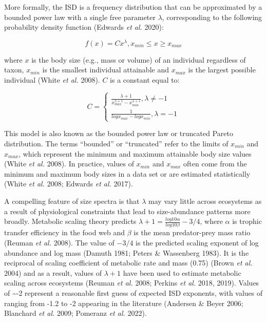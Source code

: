 \documentclass[
  12pt,
]{article}
\begin{document}
More formally, the ISD is a frequency distribution that can be
approximated by a bounded power law with a single free parameter
\(\lambda\), corresponding to the following probability density function
(Edwards \emph{et al.} 2020):

\begin{equation}
f(x) = Cx^\lambda, x_{min} \le x \ge x_{max}
\end{equation}

where \(x\) is the body size (e.g., mass or volume) of an individual
regardless of taxon, \(x_{min}\) is the smallest individual attainable
and \(x_{max}\) is the largest possible individual (White \emph{et al.}
2008). \(C\) is a constant equal to:

\begin{equation}
 C = \begin{cases}\frac{\lambda + 1}{{x_{max}^{\lambda+1}} - {x_{min}^{\lambda+1}}}, \lambda \neq-1 \\
\frac{1}{{logx_{max}} - {logx_{min}}}, \lambda = -1\end{cases}
\end{equation}

This model is also known as the bounded power law or truncated Pareto
distribution. The terms ``bounded'' or ``truncated'' refer to the limits
of \(x_{min}\) and \(x_{max}\), which represent the minimum and maximum
attainable body size values (White \emph{et al.} 2008). In practice,
values of \(x_{min}\) and \(x_{max}\) often come from the minimum and
maximum body sizes in a data set or are estimated statistically (White
\emph{et al.} 2008; Edwards \emph{et al.} 2017).

A compelling feature of size spectra is that \(\lambda\) may vary little
across ecosystems as a result of physiological constraints that lead to
size-abundance patterns more broadly. Metabolic scaling theory predicts
\(\lambda + 1 = \frac{log10\alpha}{log10\beta} - 3/4\), where \(\alpha\)
is trophic transfer efficiency in the food web and \(\beta\) is the mean
predator-prey mass ratio (Reuman \emph{et al.} 2008). The value of
\(-3/4\) is the predicted scaling exponent of log abundance and log mass
(Damuth 1981; Peters \& Wassenberg 1983). It is the reciprocal of
scaling coefficient of metabolic rate and mass (0.75) (Brown \emph{et
al.} 2004) and as a result, values of \(\lambda + 1\) have been used to
estimate metabolic scaling across ecosystems (Reuman \emph{et al.} 2008;
Perkins \emph{et al.} 2018, 2019). Values of \textasciitilde-2 represent
a reasonable first guess of expected ISD exponents, with values of
ranging from -1.2 to -2 appearing in the literature (Andersen \& Beyer
2006; Blanchard \emph{et al.} 2009; Pomeranz \emph{et al.} 2022).
\end{document}
